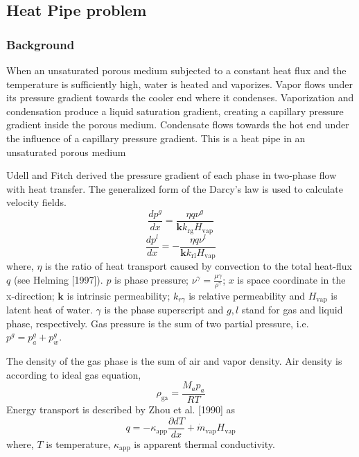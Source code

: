 \subsection{Heat Pipe problem}
\subsubsection*{Background}
When an unsaturated porous medium subjected to a constant heat flux and the temperature is sufficiently high, water is heated and vaporizes. Vapor flows under its pressure gradient towards the cooler end where it condenses. Vaporization and condensation produce a liquid saturation gradient, creating a capillary pressure gradient inside the porous medium. Condensate flows towards the hot end under the influence of a capillary pressure gradient. This is a heat pipe in an unsaturated porous medium

Udell and Fitch derived the pressure gradient of each phase in two-phase flow with heat transfer. The generalized form of the Darcy's law is used to calculate velocity fields. 
\begin{equation}
\frac{d p^g}{d x} = \frac{\eta q \nu^g}{\mathbf k k_{\mathrm {rg}} H_{\mathrm {vap}}}
\label{eq:HP1}
\end{equation}
\begin{equation}
\frac{d p^l}{d x} =- \frac{\eta q \nu^l}{\mathbf k k_{\mathrm {rl}} H_{\mathrm {vap}}}
\label{eq:HP2}
\end{equation}
where, $\eta$ is the ratio of heat transport caused by convection to the total heat-flux $q$ (see Helming [1997]). $p$ is phase pressure; $\nu^\gamma=\frac{\mu\gamma}{\rho^\gamma}$; $x$ is space coordinate in the x-direction; $\mathbf k$ is intrinsic permeability; $k_{r\gamma}$ is relative permeability and $H_{\mathrm {vap}}$ is latent heat of water. $\gamma$ is the phase superscript and $g, l$ stand for gas and liquid phase, respectively. Gas pressure is the sum of two partial pressure, i.e. $p^g=p^g_a+p^g_w$.

The density of the gas phase is the sum of air and vapor density. Air density is according to ideal gas equation,
\begin{equation}
\rho_{\mathrm {ga}}=\frac{M_a p_a}{RT} 
\label{eq:HP3}
\end{equation}
Energy transport is described by Zhou et al. [1990] as
\begin{equation}
q=-\kappa_{\mathrm {app}}\frac{\partial d T}{d x} + \dot m_{\mathrm {vap}} H_{\mathrm {vap}}
\label{eq:HP4}
\end{equation}
where, $T$ is temperature, $\kappa_{\mathrm {app}}$ is apparent thermal conductivity.

